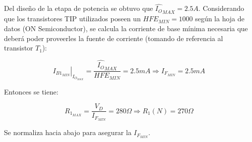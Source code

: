 Del diseño de la etapa de potencia se obtuvo que $\hat{I_O}_{MAX} = 2.5A$. Considerando que los transistores TIP utilizados poseen un $HFE_{MIN} = 1000$ según la hoja de datos (ON Semiconductor), se calcula la corriente de base mínima necesaria que deberá poder proveerles la fuente de corriente (tomando de referencia al transistor $T_1$):

\[
\left. I_{B1_{MIN}} \right|_{I_{O_{MAX}}} = \frac{\hat{I_O}_{MAX}}{HFE_{MIN}} = 2.5mA \Longrightarrow I_{F_{MIN}} = 2.5mA
\]

Entonces se tiene:

\[
R_{1_{MAX}} = \frac{V_D}{I_{F_{MIN}}} = 280\Omega \Longrightarrow R_1(N) = 270\Omega
\]

Se normaliza hacia abajo para asegurar la $I_{F_{MIN}}$.


